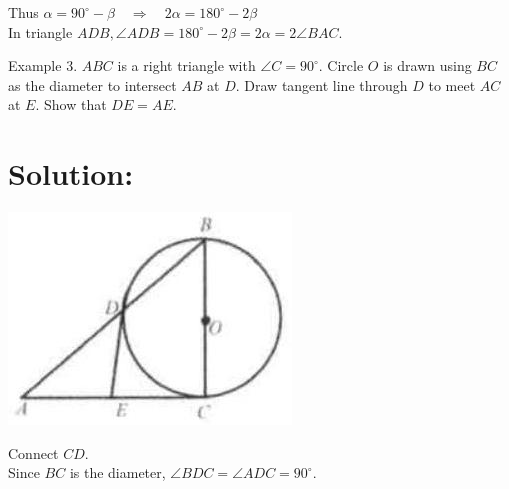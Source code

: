 \documentclass[10pt]{article}
\begin{document}
Thus \(\alpha=90^{\circ}-\beta \quad \Rightarrow \quad 2 \alpha=180^{\circ}-2 \beta\)\\
In triangle \(A D B, \angle A D B=180^{\circ}-2 \beta=2 \alpha=2 \angle B A C\).

Example 3. \(A B C\) is a right triangle with \(\angle C=90^{\circ}\). Circle \(O\) is drawn using \(B C\) as the diameter to intersect \(A B\) at \(D\). Draw tangent line through \(D\) to meet \(A C\) at \(E\). Show that \(D E=A E\).

\section*{Solution:}
\begin{center}
\includegraphics[max width=\textwidth]{2025_04_17_97bc1f7e44d93c271a88g-163(3)}
\end{center}

Connect \(C D\).\\
Since \(B C\) is the diameter, \(\angle B D C=\angle A D C=90^{\circ}\).
\end{document}
